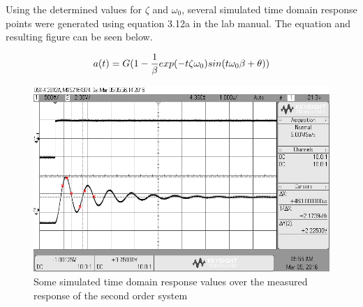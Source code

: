 Using the determined values for $\zeta$ and $\omega_0$, several simulated time domain response points were generated using equation 3.12a in the lab manual. The equation and resulting figure can be seen below.

\begin{equation}\label{eqn:timedomainresponse}
a(t) = {G(1-{1 \over \beta}exp(-t\zeta\omega_0)sin(t\omega_0\beta + \theta))}
\end{equation} 


\begin{figure}
	\centering
	\includegraphics[width=0.7\linewidth]{graphics/overshoot_simulated}
	\caption{Some simulated time domain response values over the measured response of the second order system}
	\label{fig:overshoot_sim}
\end{figure}